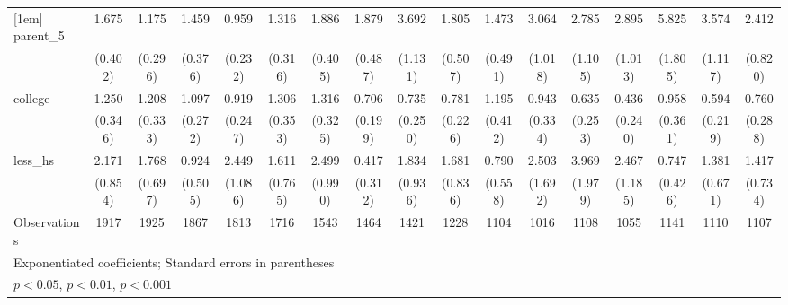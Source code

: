 {\begin{tabular}{l*{16}{c}}
[1em]
parent\_5            &       1.675\sym{*}  &       1.175         &       1.459         &       0.959         &       1.316         &       1.886\sym{**} &       1.879\sym{*}  &       3.692\sym{***}&       1.805\sym{*}  &       1.473         &       3.064\sym{***}&       2.785\sym{**} &       2.895\sym{**} &       5.825\sym{***}&       3.574\sym{***}&       2.412\sym{**} \\
                    &     (0.402)         &     (0.296)         &     (0.376)         &     (0.232)         &     (0.316)         &     (0.405)         &     (0.487)         &     (1.131)         &     (0.507)         &     (0.491)         &     (1.018)         &     (1.105)         &     (1.013)         &     (1.805)         &     (1.117)         &     (0.820)         \\
[1em]
college             &       1.250         &       1.208         &       1.097         &       0.919         &       1.306         &       1.316         &       0.706         &       0.735         &       0.781         &       1.195         &       0.943         &       0.635         &       0.436         &       0.958         &       0.594         &       0.760         \\
                    &     (0.346)         &     (0.333)         &     (0.272)         &     (0.247)         &     (0.353)         &     (0.325)         &     (0.199)         &     (0.250)         &     (0.226)         &     (0.412)         &     (0.334)         &     (0.253)         &     (0.240)         &     (0.361)         &     (0.219)         &     (0.288)         \\
[1em]
less\_hs             &       2.171\sym{*}  &       1.768         &       0.924         &       2.449\sym{*}  &       1.611         &       2.499\sym{*}  &       0.417         &       1.834         &       1.681         &       0.790         &       2.503         &       3.969\sym{**} &       2.467         &       0.747         &       1.381         &       1.417         \\
                    &     (0.854)         &     (0.697)         &     (0.505)         &     (1.086)         &     (0.765)         &     (0.990)         &     (0.312)         &     (0.936)         &     (0.836)         &     (0.558)         &     (1.692)         &     (1.979)         &     (1.185)         &     (0.426)         &     (0.671)         &     (0.734)         \\
\hline
Observations        &        1917         &        1925         &        1867         &        1813         &        1716         &        1543         &        1464         &        1421         &        1228         &        1104         &        1016         &        1108         &        1055         &        1141         &        1110         &        1107         \\
\hline\hline
\multicolumn{17}{l}{\footnotesize Exponentiated coefficients; Standard errors in parentheses}\\
\multicolumn{17}{l}{\footnotesize \sym{*} \(p<0.05\), \sym{**} \(p<0.01\), \sym{***} \(p<0.001\)}\\
\end{tabular}
}
